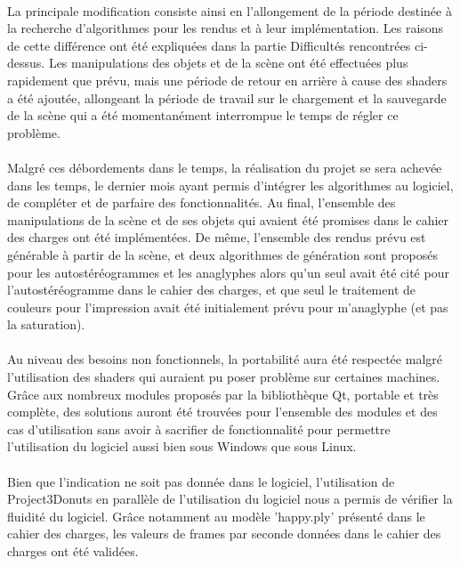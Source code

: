 \paragraph{}
La principale modification consiste ainsi en l'allongement de la période destinée à la recherche d'algorithmes pour les rendus et à leur implémentation. Les raisons de cette différence ont été expliquées dans la partie Difficultés rencontrées ci-dessus.
Les manipulations des objets et de la scène ont été effectuées plus rapidement que prévu, mais une période de retour en arrière à cause des shaders a été ajoutée, allongeant la période de travail sur le chargement et la sauvegarde de la scène qui a été momentanément interrompue le temps de régler ce problème.

\paragraph{}
Malgré ces débordements dans le temps, la réalisation du projet se sera achevée dans les temps, le dernier mois ayant permis d'intégrer les algorithmes au logiciel, de compléter et de parfaire des fonctionnalités.
Au final, l'ensemble des manipulations de la scène et de ses objets qui avaient été promises dans le cahier des charges ont été implémentées. De même, l'ensemble des rendus prévu est générable à partir de la scène, et deux algorithmes de génération sont proposés pour les autostéréogrammes et les anaglyphes alors qu'un seul avait été cité pour l'autostéréogramme dans le cahier des charges, et que seul le traitement de couleurs pour l'impression avait été initialement prévu pour m'anaglyphe (et pas la saturation).

\paragraph{}
Au niveau des besoins non fonctionnels, la portabilité aura été respectée malgré l'utilisation des shaders qui auraient pu poser problème sur certaines machines. Grâce aux nombreux modules proposés par la bibliothèque Qt, portable et très complète, des solutions auront été trouvées pour l'ensemble des modules et des cas d'utilisation sans avoir à sacrifier de fonctionnalité pour permettre l'utilisation du logiciel aussi bien sous Windows que sous Linux.

\paragraph{}
Bien que l'indication ne soit pas donnée dans le logiciel, l'utilisation de Project3Donuts en parallèle de l'utilisation du logiciel nous a permis de vérifier la fluidité du logiciel. Grâce notamment au modèle 'happy.ply' présenté dans le cahier des charges, les valeurs de frames par seconde données dans le cahier des charges ont été validées.

